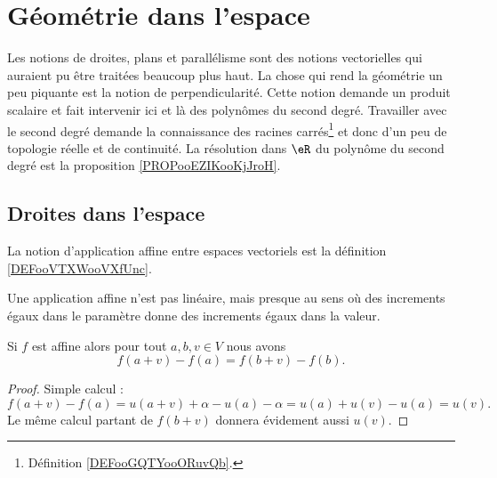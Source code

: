 

\section{Géométrie dans l'espace}

\begin{normaltext}
	Les notions de droites, plans et parallélisme sont des notions vectorielles qui auraient pu être traitées beaucoup plus haut. La chose qui rend la géométrie un peu piquante est la notion de perpendicularité. Cette notion demande un produit scalaire et fait intervenir ici et là des polynômes du second degré. Travailler avec le second degré demande la connaissance des racines carrés\footnote{Définition \ref{DEFooGQTYooORuvQb}.} et donc d'un peu de topologie réelle et de continuité. La résolution dans \( \eR\) du polynôme du second degré est la proposition \ref{PROPooEZIKooKjJroH}.
\end{normaltext}

\subsection{Droites dans l'espace}

La notion d'application affine entre espaces vectoriels est la définition \ref{DEFooVTXWooVXfUnc}.

Une application affine n'est pas linéaire, mais presque au sens où des increments égaux dans le paramètre donne des increments égaux dans la valeur.
\begin{lemma}       \label{LEMooEQEAooQaFCMW}
	Si \( f\) est affine alors pour tout \( a,b,v\in V\) nous avons
	\begin{equation}
		f(a+v)-f(a)=f(b+v)-f(b).
	\end{equation}
\end{lemma}

\begin{proof}
	Simple calcul :
	\begin{equation}
		f(a+v)-f(a)=u(a+v)+\alpha-u(a)-\alpha=u(a)+u(v)-u(a)=u(v).
	\end{equation}
	Le même calcul partant de \( f(b+v)\) donnera évidement aussi \( u(v)\).
\end{proof}


